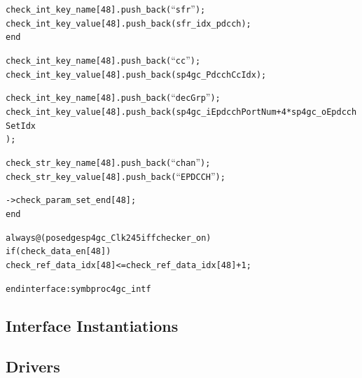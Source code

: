 \documentclass{note}
\begin{document}
\begin{alltt}
      check_int_key_name[48].push_back(``sfr'');
      check_int_key_value[48].push_back(sfr_idx_pdcch);
    end

    check_int_key_name[48].push_back(``cc'');
    check_int_key_value[48].push_back(sp4gc_PdcchCcIdx);

    check_int_key_name[48].push_back(``decGrp'');
    check_int_key_value[48].push_back(sp4gc_iEpdcchPortNum+4*sp4gc_oEpdcchSetIdx
);

    check_str_key_name[48].push_back(``chan'');
    check_str_key_value[48].push_back(``EPDCCH'');

    ->check_param_set_end[48];
  end

  always@(posedge sp4gc_Clk245 iff checker_on)
    if(check_data_en[48])
      check_ref_data_idx[48] <= check_ref_data_idx[48]+1;

endinterface : symbproc4gc_intf
\end{alltt}

\subsection{Interface Instantiations}

\subsection{Drivers}
\end{document}
